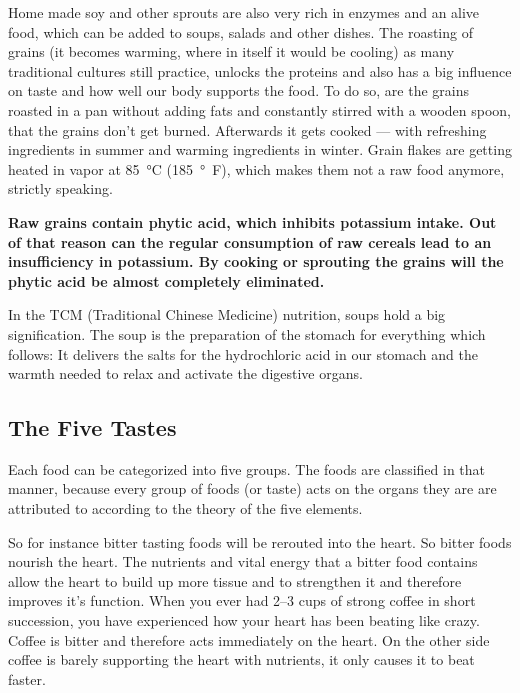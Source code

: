 \documentclass[../main.tex]{subfiles}
\begin{document}
Home made soy and other sprouts are also very rich in enzymes and an alive food, which can be added to soups, salads and other dishes.
The roasting of grains (it becomes warming, where in itself it would be cooling) as many traditional cultures still practice,
unlocks the proteins and also has a big influence on taste and how well our body supports the food.
To do so, are the grains roasted in a pan without adding fats and constantly stirred with a wooden spoon, that the grains don't get burned.
Afterwards it gets cooked --- with refreshing ingredients in summer and warming ingredients in winter.
Grain flakes are getting heated in vapor at \SI{85}{\celsius} (\SI{185}{\degree\F}), which makes them not a raw food anymore, strictly speaking.

\textbf{Raw grains contain phytic acid, which inhibits potassium intake.
  Out of that reason can the regular consumption of raw cereals lead to an insufficiency in potassium.
  By cooking or sprouting the grains will the phytic acid be almost completely eliminated.}

In the TCM (Traditional Chinese Medicine) nutrition, soups hold a big signification.
The soup is the preparation of the stomach for everything which follows: It delivers the salts
for the hydrochloric acid in our stomach and the warmth needed to relax and activate the digestive organs.



\subsection{The Five Tastes}

Each food can be categorized into five groups.
The foods are classified in that manner, because every group of foods (or taste) acts on the organs they are are attributed to according to the theory of the five elements.

So for instance bitter tasting foods will be rerouted into the heart.
So bitter foods nourish the heart.
The nutrients and vital energy that a bitter food contains allow the heart to build up more tissue and to strengthen it and therefore improves it's function.
When you ever had 2--3 cups of strong coffee in short succession, you have experienced how your heart has been beating like crazy.
Coffee is bitter and therefore acts immediately on the heart.
On the other side coffee is barely supporting the heart with nutrients, it only causes it to beat faster.
\end{document}
